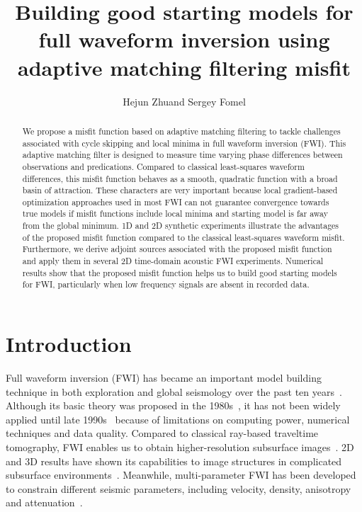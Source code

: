 \title{Building good starting models for full waveform inversion 
using adaptive matching filtering misfit}
\author{Hejun Zhu\footnotemark[1] and Sergey Fomel\footnotemark[2]}

\address{
\footnotemark[1] Department of Geosciences,
The University of Texas at Dallas, 
Richardson, TX, 75080.
\footnotemark[2] Bureau of Economic Geology,
Jackson School of Geosciences,
The University of Texas at Austin,
Austin, TX 78713.}


\maketitle

\begin{abstract}  
We propose a misfit function based on adaptive matching filtering to tackle
challenges associated with cycle skipping and local minima in full waveform inversion (FWI).  
This adaptive matching filter is designed to measure time varying phase 
differences between observations and predications. Compared to classical 
least-squares waveform differences, this misfit function behaves as a smooth, quadratic 
function with a broad basin of attraction. These characters are very important 
because local gradient-based optimization approaches used in most FWI can not 
guarantee convergence towards true models if misfit functions include 
local minima and starting model is far away from the global minimum. 
1D and 2D synthetic experiments illustrate the advantages of the proposed misfit function 
compared to the classical least-squares waveform misfit. Furthermore, we derive 
adjoint sources associated with the proposed misfit function and apply them 
in several 2D time-domain acoustic FWI experiments. 
Numerical results show that the proposed misfit function helps us to build 
good starting models for FWI, particularly when low frequency signals are absent in recorded data. 
\end{abstract} 

\section{Introduction} 
Full waveform inversion (FWI) has became an important model building technique in both exploration and global seismology 
over the past ten years~\citep{fwi2009, Fichtner2009, Tape2009, Zhuetal2012, Zhuetal2013_att,
Zhuetal2013_aniso}. Although its basic theory was proposed in the 1980s~\citep{Lailly1983, 
Tarantola1984, Gauthier_Tarantola1986}, it has not been widely applied 
until late 1990s~\citep{Pratt1998} because of limitations on computing power, 
numerical techniques and data quality. Compared to classical ray-based traveltime tomography, 
FWI enables us to obtain higher-resolution subsurface images~\citep{Sirgue2010}. 
2D and 3D results have shown its capabilities to image structures in 
complicated subsurface environments~\citep{Virieux2009, fwi3D}. 
Meanwhile, multi-parameter FWI has been developed to constrain different 
seismic parameters, including velocity, density, anisotropy 
and attenuation~\citep{attenfwi, multifwi, Warner2013}. 

